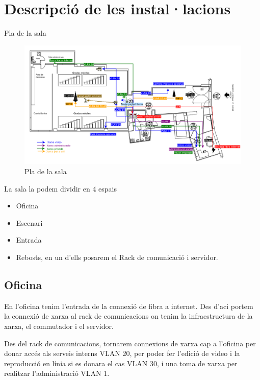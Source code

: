 \documentclass[
  10pt,
]{krantz}
\providecommand{\tightlist}{%
  \setlength{\itemsep}{0pt}\setlength{\parskip}{0pt}}
\begin{document}
\hypertarget{descripciuxf3-de-les-installacions}{%
\section{Descripció de les instal·lacions}\label{descripciuxf3-de-les-installacions}}

Pla de la sala

\begin{figure}
\centering
\includegraphics{imatges/teatre.png}
\caption{Pla de la sala}
\end{figure}

La sala la podem dividir en 4 espais

\begin{itemize}
\tightlist
\item
  Oficina
\item
  Escenari
\item
  Entrada
\item
  Rebosts, en un d'ells posarem el Rack de comunicació i servidor.
\end{itemize}

\hypertarget{oficina}{%
\subsection{Oficina}\label{oficina}}

En l'oficina tenim l'entrada de la connexió de fibra a internet. Des d'aci portem la connexió de xarxa al rack de comunicacions on tenim la infraestructura de la xarxa, el commutador i el servidor.

Des del rack de comunicacions, tornarem connexions de xarxa cap a l'oficina per donar accés als serveis interns VLAN 20, per poder fer l'edició de video i la reproducció en línia si es donara el cas VLAN 30, i una toma de xarxa per realitzar l'administració VLAN 1.
\end{document}
